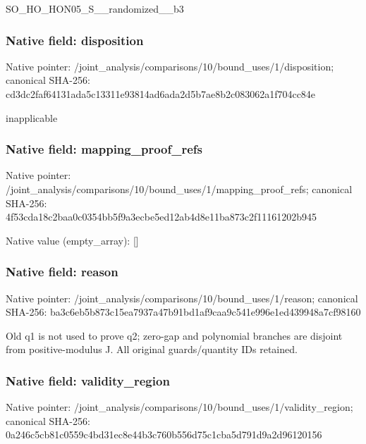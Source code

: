 \documentclass[10pt,a4paper]{article}
\begin{document}
\begingroup\raggedright\sloppy SO\_\allowbreak{}HO\_\allowbreak{}HON05\_\allowbreak{}S\_\allowbreak{}\_\allowbreak{}randomized\_\allowbreak{}\_\allowbreak{}b3\par\endgroup

\subsubsection{Native field: disposition}
Native pointer: /joint\_\allowbreak{}analysis/comparisons/10/bound\_\allowbreak{}uses/1/disposition; canonical SHA-256: cd3dc2faf64131ada5c13311e93814ad6ada2d5b7ae8b2c083062a1f704cc84e

\begingroup\raggedright\sloppy inapplicable\par\endgroup

\subsubsection{Native field: mapping\_\allowbreak{}proof\_\allowbreak{}refs}
Native pointer: /joint\_\allowbreak{}analysis/comparisons/10/bound\_\allowbreak{}uses/1/mapping\_\allowbreak{}proof\_\allowbreak{}refs; canonical SHA-256: 4f53cda18c2baa0c0354bb5f9a3ecbe5ed12ab4d8e11ba873c2f11161202b945

Native value (empty\_\allowbreak{}array): []

\subsubsection{Native field: reason}
Native pointer: /joint\_\allowbreak{}analysis/comparisons/10/bound\_\allowbreak{}uses/1/reason; canonical SHA-256: ba3c6eb5b873c15ea7937a47b91bd1af9caa9c541e996e1ed439948a7cf98160

\begingroup\raggedright\sloppy Old q1 is not used to prove q2;\allowbreak{} zero-gap and polynomial branches are disjoint from positive-modulus J. All original guards/\allowbreak{}quantity IDs retained.\par\endgroup

\subsubsection{Native field: validity\_\allowbreak{}region}
Native pointer: /joint\_\allowbreak{}analysis/comparisons/10/bound\_\allowbreak{}uses/1/validity\_\allowbreak{}region; canonical SHA-256: 0a246c5cb81c0559c4bd31ec8e44b3c760b556d75c1cba5d791d9a2d96120156
\end{document}
